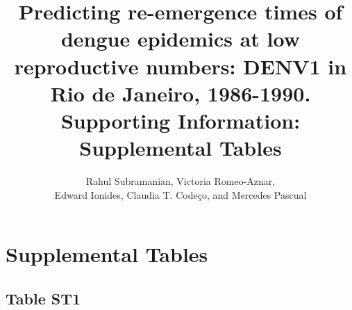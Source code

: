 \documentclass{article}
\begin{document}


\title{%
  Predicting re-emergence times of dengue epidemics at low reproductive numbers: DENV1 in Rio de Janeiro, 1986-1990. \\
  \large Supporting Information: Supplemental Tables}
\author{Rahul Subramanian, Victoria Romeo-Aznar, \\ Edward Ionides, Claudia T. Code\c{c}o, and Mercedes Pascual}





\maketitle

\tableofcontents

\newpage 

\section{Supplemental Tables}


\subsection{Table ST1}
\end{document}
